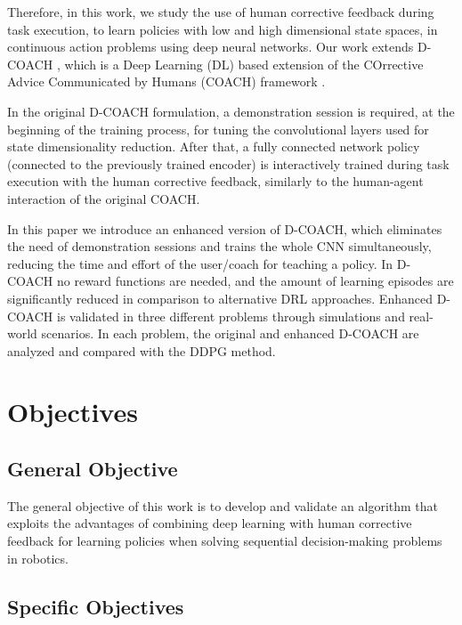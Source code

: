\begin{intro}
Therefore, in this work, we study the use of human corrective feedback during task execution, to learn policies with low and high dimensional state spaces, in continuous action problems using deep neural networks. Our work extends D-COACH \cite{perez2018interactive}, which is a Deep Learning (DL) based extension of the COrrective Advice Communicated by Humans (COACH) framework \cite{Celemin2018AnInteractive}. 

In the original D-COACH formulation, a demonstration session is required, at the beginning of the training process, for tuning the convolutional layers used for state dimensionality reduction. After that, a fully connected network policy (connected to the previously trained encoder) is interactively trained during task execution with the human corrective feedback, similarly to the human-agent interaction of the original COACH.

In this paper we introduce an enhanced version of D-COACH, which eliminates the need of demonstration sessions and trains the whole CNN simultaneously, reducing the time and effort of the user/coach for teaching a policy.  In D-COACH no reward functions are needed, and the amount of learning episodes are significantly reduced in comparison to alternative DRL approaches. Enhanced D-COACH is validated in three different problems through simulations and real-world scenarios. In each problem, %
the original and enhanced D-COACH are analyzed and compared with the DDPG method. 


\section{Objectives}
\subsection{General Objective}
The general objective of this work is to develop and validate an algorithm that exploits the advantages of combining deep learning with human corrective feedback for learning policies when solving sequential decision-making problems in robotics. 

\subsection{Specific Objectives}


\end{intro}
